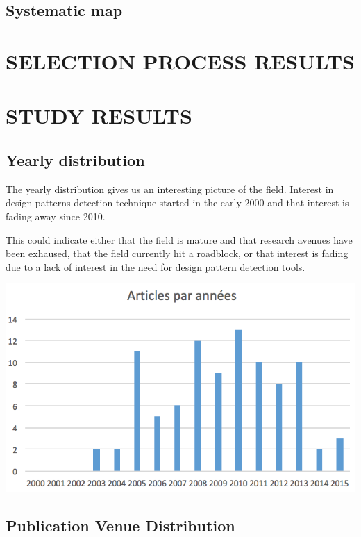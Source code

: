 \documentclass[letterpaper, 10 pt, conference]{ieeeconf}  %
\begin{document}
\subsection{Systematic map}



\section{SELECTION PROCESS RESULTS}




\section{STUDY RESULTS}

\subsection{Yearly distribution}

The yearly distribution gives us an interesting picture of the field.
Interest in design patterns detection technique started in the early
2000 and that interest is fading away since 2010.

This could indicate either that the field is mature and that research avenues
have been exhaused, that the field currently hit a roadblock, or that interest
is fading due to a lack of interest in the need for design pattern detection
tools.

\begin{center}
\includegraphics[scale=0.7]{articles_by_years.png}
\end{center}


\subsection{Publication Venue Distribution}
\end{document}
